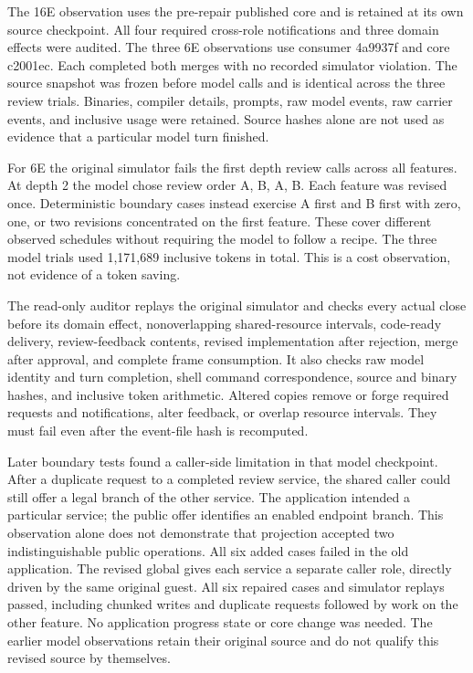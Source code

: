 \documentclass[10pt]{article}
\begin{document}
The 16E observation uses the pre-repair published core and is retained at its
own source checkpoint. All four required cross-role notifications and three
domain effects were audited. The three 6E observations use consumer 4a9937f and
core c2001ec. Each completed both merges with no recorded simulator violation.
The source snapshot was frozen before model calls and is identical across the
three review trials. Binaries, compiler details, prompts, raw model events, raw
carrier events, and inclusive usage were retained. Source hashes alone are not
used as evidence that a particular model turn finished.

For 6E the original simulator fails the first depth review calls across all
features. At depth 2 the model chose review order A, B, A, B. Each feature was
revised once. Deterministic boundary cases instead exercise A first and B first
with zero, one, or two revisions concentrated on the first feature. These cover
different observed schedules without requiring the model to follow a recipe.
The three model trials used 1,171,689 inclusive tokens in total. This is a cost
observation, not evidence of a token saving.

The read-only auditor replays the original simulator and checks every actual
close before its domain effect, nonoverlapping shared-resource intervals,
code-ready delivery, review-feedback contents, revised implementation after
rejection, merge after approval, and complete frame consumption. It also checks
raw model identity and turn completion, shell command correspondence, source
and binary hashes, and inclusive token arithmetic. Altered copies remove or
forge required requests and notifications, alter feedback, or overlap resource
intervals. They must fail even after the event-file hash is recomputed.

Later boundary tests found a caller-side limitation in that model checkpoint.
After a duplicate request to a completed review service, the shared caller
could still offer a legal branch of the other service. The application intended
a particular service; the public offer identifies an enabled endpoint branch.
This observation alone does not demonstrate that projection accepted two
indistinguishable public operations. All six added cases failed in the old application.
The revised global gives each service a separate caller role, directly driven
by the same original guest. All six repaired cases and simulator replays passed,
including chunked writes and duplicate requests followed by work on the other
feature. No application progress state or core change was needed. The earlier
model observations retain their original source and do not qualify this revised
source by themselves.
\end{document}
